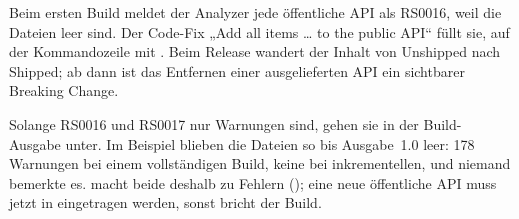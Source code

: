 \begin{note}[Einrichtung]
  Beim ersten Build meldet der Analyzer jede öffentliche API als RS0016, weil die Dateien
  leer sind. Der Code-Fix „Add all items … to the public API“ füllt sie, auf der
  Kommandozeile mit
  . Beim Release
  wandert der Inhalt von Unshipped nach Shipped; ab dann ist das Entfernen einer
  ausgelieferten API ein sichtbarer Breaking Change.
\end{note}

\begin{important}
  Solange RS0016 und RS0017 nur Warnungen sind, gehen sie in der Build-Ausgabe unter. Im
  Beispiel blieben die Dateien so bis Ausgabe~1.0 leer: 178 Warnungen bei einem vollständigen
  Build, keine bei inkrementellen, und niemand bemerkte es.
   macht beide deshalb zu Fehlern
  (); eine neue öffentliche API muss jetzt
  in  eingetragen
  werden, sonst bricht der Build.
\end{important}
